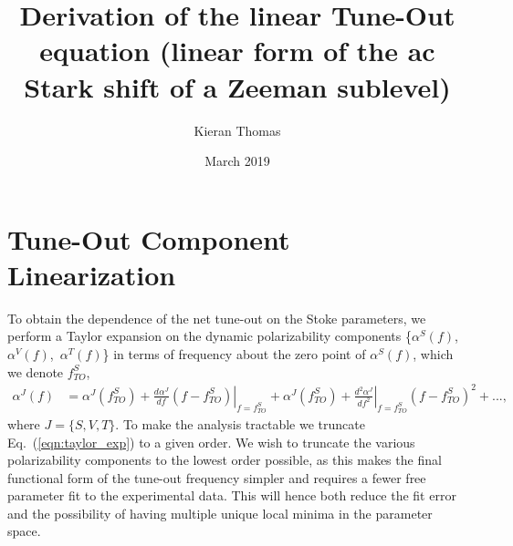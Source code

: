 \documentclass{article}
\title{Derivation of the linear Tune-Out equation (linear form of the ac
Stark shift of a Zeeman sublevel)}
\author{Kieran Thomas}
\date{March 2019}
\newcommand{\difn}[3]{\frac{d^#3 #1}{d #2^#3}}
\newcommand{\derivn}[3][{}]{
    \frac{d^{#1} #2}{d #3^{#1}}
}
\begin{document}
\maketitle
\section{Tune-Out Component Linearization}
To obtain the dependence of the net tune-out on the Stoke parameters, we perform a Taylor expansion on the dynamic polarizability components \{\(\alpha^S(f)\),\, \(\alpha^V(f)\),\, \(\alpha^T(f)\)\} in terms of frequency about the zero point of \(\alpha^S(f)\), which we denote \(f^{S}_{TO}\),
\begin{align}
    \alpha^J(f) &= \alpha^J(f^{S}_{TO}) + \left. \derivn{\alpha^J}{f}{{}}(f-f^{S}_{TO})\right|_{f=f^{S}_{TO}} + \alpha^J(f^{S}_{TO}) +\left. \difn{\alpha^J}{f}{2}\right|_{f=f^{S}_{TO}}(f-f^{S}_{TO})^2 + ...,\label{eqn:taylor_exp}
\end{align}
where \(J=\{S,V,T\}\). To make the analysis tractable we truncate Eq.~(\ref{eqn:taylor_exp}) to a given order. We wish to truncate the various polarizability components to the lowest order possible, as this makes the final functional form of the tune-out frequency simpler and requires a fewer free parameter fit to the experimental data. This will hence both reduce the fit error and the possibility of having multiple unique local minima in the parameter space.
\end{document}
